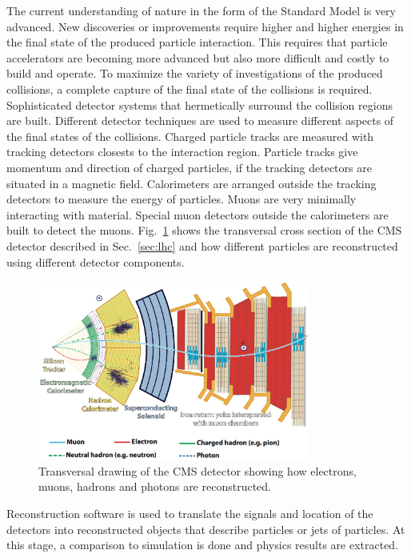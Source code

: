 \documentclass{wscpaperproc}
\theoremstyle{wsc}
\begin{document}
The current understanding of nature in the form of the Standard Model is very advanced. New discoveries or improvements require higher and higher energies in the final state of the produced particle interaction. This requires that particle accelerators are becoming more advanced but also more difficult and costly to build and operate. To maximize the variety of investigations of the produced collisions, a complete capture of the final state of the collisions is required. Sophisticated detector systems that hermetically surround the collision regions are built. Different detector techniques are used to measure different aspects of the final states of the collisions. Charged particle tracks are measured with tracking detectors closests to the interaction region. Particle tracks give momentum and direction of charged particles, if the tracking detectors are situated in a magnetic field. Calorimeters are arranged outside the tracking detectors to measure the energy of particles. Muons are very minimally interacting with material. Special muon detectors outside the calorimeters are built to detect the muons. Fig.~\ref{fig:cmscross} shows the transversal cross section of the CMS detector described in Sec.~\ref{sec:lhc} and how different particles are reconstructed using different detector components.

\begin{figure}[htb]
{
   \centering
   \includegraphics[width=0.80\textwidth]{cms_transversal_drawing}
   \caption{Transversal drawing of the CMS detector showing how electrons, muons, hadrons and photons are reconstructed.
   \label{fig:cmscross}}
}
\end{figure}

Reconstruction software is used to translate the signals and location of the detectors into reconstructed objects that describe particles or jets of particles. At this stage, a comparison to simulation is done and physics results are extracted.
\end{document}
